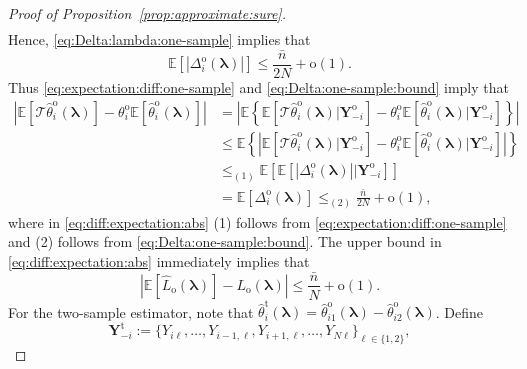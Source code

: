 \documentclass[12pt,letterpaper]{article}
\begin{document}
\begin{proof}[Proof of Proposition~\ref{prop:approximate:sure}]
$$\begin{array}{rl}
\end{array}$$
Hence, \eqref{eq:Delta:lambda:one-sample} implies that 
\begin{equation}\label{eq:Delta:one-sample:bound}
\mathbb{E}[|\Delta_i^{\mathrm{o}}(\boldsymbol{\lambda})|]\leq\frac{\bar{n}}{2N}+\mathrm{o}(1).
\end{equation}
Thus \eqref{eq:expectation:diff:one-sample} and \eqref{eq:Delta:one-sample:bound} imply that 
\begin{equation}\label{eq:diff:expectation:abs}
\begin{array}{rl}
    \left|\mathbb{E}\left[\mathcal{T}\hat{\theta}_i^{\mathrm{o}}(\boldsymbol{\lambda})\right]-\theta_i^{\mathrm{o}}\mathbb{E}\left[\hat{\theta}_i^{\mathrm{o}}(\boldsymbol{\lambda})\right]\right|\!\!\!\!\!&\displaystyle=\left|\mathbb{E}\left\{\mathbb{E}\left[\mathcal{T}\hat{\theta}_i^{\mathrm{o}}(\boldsymbol{\lambda})\big|\mathbf{Y}_{-i}^{\mathrm{o}}\right]-\theta_i^{\mathrm{o}}\mathbb{E}\left[\hat{\theta}_i^{\mathrm{o}}(\boldsymbol{\lambda})\big|\mathbf{Y}_{-i}^{\mathrm{o}}\right]\right\}\right|\\
    &\displaystyle\leq\mathbb{E}\left\{\left|\mathbb{E}\left[\mathcal{T}\hat{\theta}_i^{\mathrm{o}}(\boldsymbol{\lambda})\big|\mathbf{Y}_{-i}^{\mathrm{o}}\right]-\theta_i^{\mathrm{o}}\mathbb{E}\left[\hat{\theta}_i^{\mathrm{o}}(\boldsymbol{\lambda})\big|\mathbf{Y}_{-i}^{\mathrm{o}}\right]\right|\right\}\\
    &\displaystyle\leq_{(1)}\mathbb{E}\left[\mathbb{E}\left[\left|\Delta_i^{\mathrm{o}}(\boldsymbol{\lambda})\right|\big|\mathbf{Y}_{-i}^{\mathrm{o}}\right]\right]\\
    &\displaystyle=\mathbb{E}\left[\Delta_i^{\mathrm{o}}(\boldsymbol{\lambda})\right]\leq_{(2)}\frac{\bar{n}}{2N}+\mathrm{o}(1),
\end{array}
\end{equation}
where in \eqref{eq:diff:expectation:abs} (1) follows from \eqref{eq:expectation:diff:one-sample} and (2) follows from \eqref{eq:Delta:one-sample:bound}. The upper bound in \eqref{eq:diff:expectation:abs} immediately implies that 
$$\left|\mathbb{E}\left[\hat{L}_{\mathrm{o}}(\boldsymbol{\lambda})\right]-L_{\mathrm{o}}(\boldsymbol{\lambda})\right|\leq\frac{\bar{n}}{N}+\mathrm{o}(1).$$
For the two-sample estimator, note that $\hat{\theta}_i^{\mathrm{t}}(\boldsymbol{\lambda})=\hat{\theta}_{i1}^{\mathrm{o}}(\boldsymbol{\lambda})-\hat{\theta}_{i2}^{\mathrm{o}}(\boldsymbol{\lambda})$. Define
$$\mathbf{Y}_{-i}^{\mathrm{t}}:=\{Y_{i\ell},\ldots,Y_{i-1,\ell},Y_{i+1,\ell},\ldots,Y_{N\ell}\}_{\ell\in\{1,2\}},$$

\end{proof}
\end{document}

